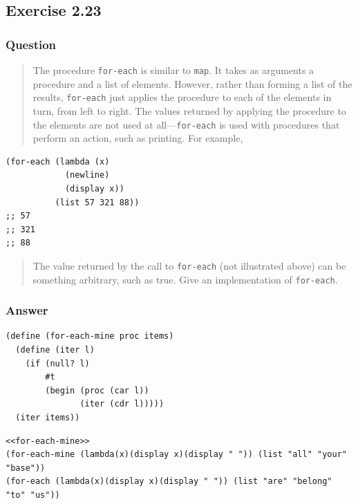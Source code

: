 \documentclass[final,fleqn,titlepage,twoside]{article}
\begin{document}
\subsection{Exercise 2.23}
\label{sec:org501d2f3}
\subsubsection{Question}
\label{sec:orgeff816e}
\begin{quote}
The procedure \texttt{for-each} is similar to \texttt{map}. It takes as
arguments a procedure and a list of elements. However, rather than forming a
list of the results, \texttt{for-each} just applies the procedure to each of
the elements in turn, from left to right. The values returned by applying the
procedure to the elements are not used at all---\texttt{for-each} is used
with procedures that perform an action, such as printing. For example,
\end{quote}

\begin{verbatim}
(for-each (lambda (x)
            (newline)
            (display x))
          (list 57 321 88))
;; 57
;; 321
;; 88
\end{verbatim}

\begin{quote}
The value returned by the call to \texttt{for-each} (not illustrated above)
can be something arbitrary, such as true. Give an implementation of
\texttt{for-each}.
\end{quote}

\subsubsection{Answer}
\label{sec:orgf90d1de}
\begin{verbatim}
(define (for-each-mine proc items)
  (define (iter l)
    (if (null? l)
        #t
        (begin (proc (car l))
               (iter (cdr l)))))
  (iter items))
\end{verbatim}
\begin{verbatim}
<<for-each-mine>>
(for-each-mine (lambda(x)(display x)(display " ")) (list "all" "your" "base"))
(for-each (lambda(x)(display x)(display " ")) (list "are" "belong" "to" "us"))
\end{verbatim}
\end{document}
